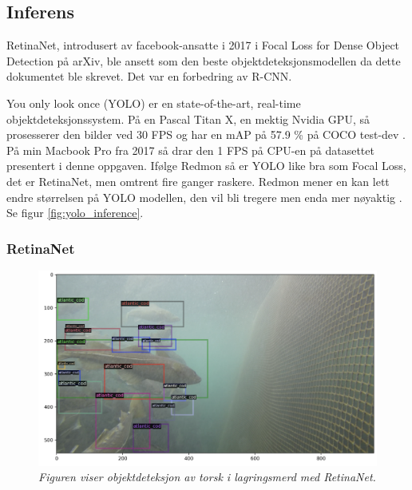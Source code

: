 
\subsection{Inferens}

RetinaNet, introdusert av facebook-ansatte i 2017 i Focal Loss for Dense Object Detection på arXiv, ble ansett som den beste objektdeteksjonsmodellen da dette dokumentet ble skrevet. Det var en forbedring av R-CNN. \cite{Lin m.fl. 2017}

You only look once (YOLO) er en state-of-the-art, real-time objektdeteksjonssystem. På en Pascal Titan X, en mektig Nvidia GPU, så prosesserer den bilder ved 30 FPS og har en mAP på 57.9 \% på COCO test-dev \cite{Redmon m.fl. 2020}. På min Macbook Pro fra 2017 så drar den 1 FPS på CPU-en på datasettet presentert i denne oppgaven. Ifølge Redmon så er YOLO like bra som Focal Loss, det er RetinaNet, men omtrent fire ganger raskere. Redmon mener en kan lett endre størrelsen på YOLO modellen, den vil bli tregere men enda mer nøyaktig \cite{Redmon 2020}. Se figur \ref{fig:yolo_inference}. %

\subsubsection{RetinaNet}

\begin{figure}
\begin{center} 
\includegraphics[scale=0.35]{figures/retinanet_cod}
\caption{\small \sl Figuren viser objektdeteksjon av torsk i lagringsmerd med RetinaNet. \label{fig:retinenet_inference}} 
\end{center} 
\end{figure} 

